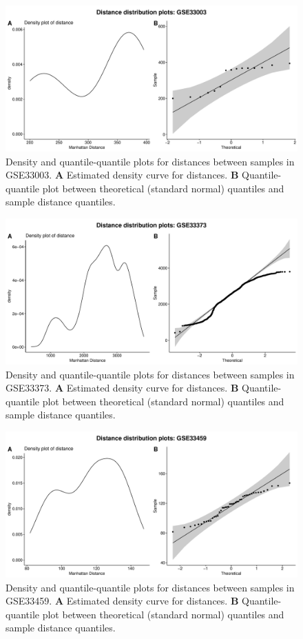 \documentclass[10pt,letterpaper]{article}\usepackage[]{graphicx}\usepackage[]{color}
\begin{document}
\begin{figure}[H]
	\includegraphics[width=\textwidth]{manhattan-distance_hist_GSE33003.pdf}
	\caption{Density and quantile-quantile plots for distances between samples in GSE33003. \textbf{A} Estimated density curve for distances. \textbf{B} Quantile-quantile plot between theoretical (standard normal) quantiles and sample distance quantiles.}
\end{figure}

\begin{figure}[H]
	\includegraphics[width=\textwidth]{manhattan-distance_hist_GSE33373.pdf}
	\caption{Density and quantile-quantile plots for distances between samples in GSE33373. \textbf{A} Estimated density curve for distances. \textbf{B} Quantile-quantile plot between theoretical (standard normal) quantiles and sample distance quantiles.}
\end{figure}

\begin{figure}[H]
	\includegraphics[width=\textwidth]{manhattan-distance_hist_GSE33459.pdf}
	\caption{Density and quantile-quantile plots for distances between samples in GSE33459. \textbf{A} Estimated density curve for distances. \textbf{B} Quantile-quantile plot between theoretical (standard normal) quantiles and sample distance quantiles.}
\end{figure}
\end{document}
